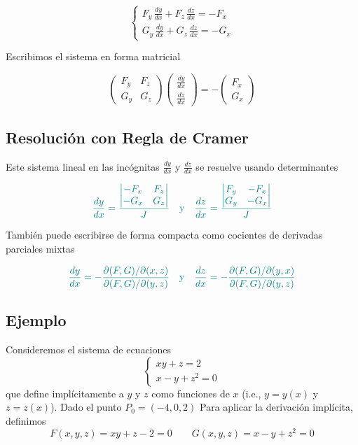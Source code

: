\documentclass{article}
\begin{document}
\[
\begin{cases}
F_y\,\frac{dy}{dx}+F_z\,\frac{dz}{dx}=-F_x \\
G_y\,\frac{dy}{dx}+G_z\,\frac{dz}{dx}=-G_x
\end{cases}
\]

Escribimos el sistema en forma matricial

\[
\begin{pmatrix}
F_y & F_z \\
G_y & G_z
\end{pmatrix}
\begin{pmatrix}
\frac{dy}{dx} \\
\frac{dz}{dx}
\end{pmatrix}
=
-\begin{pmatrix}
F_x \\
G_x
\end{pmatrix}
\]

\subsection*{Resolución con Regla de Cramer}

Este sistema lineal en las incógnitas \( \frac{dy}{dx} \) y \( \frac{dz}{dx} \) se resuelve usando determinantes

\[\color{teal}
\frac{dy}{dx} =
\frac{
\begin{vmatrix}
-F_x & F_z \\
-G_x & G_z
\end{vmatrix}
}{J}
\quad \text{y} \quad
\frac{dz}{dx} =
\frac{
\begin{vmatrix}
F_y & -F_x \\
G_y & -G_x
\end{vmatrix}
}{J}
\]

También puede escribirse de forma compacta como cocientes de derivadas parciales mixtas

\[\color{teal}
\frac{dy}{dx} = -\frac{\partial(F,G)/\partial(x,z)}{\partial(F,G)/\partial(y,z)}
\quad \text{y} \quad 
\frac{dz}{dx} = -\frac{\partial(F,G)/\partial(y,x)}{\partial(F,G)/\partial(y,z)}
\]
\subsection*{Ejemplo}

Consideremos el sistema de ecuaciones
\[
\begin{cases}
xy + z = 2 \\
x - y + z^2 = 0
\end{cases}
\]
que define implícitamente a \( y \) y \( z \) como funciones de \( x \) (i.e., \( y=y(x) \) y \( z=z(x) \)). Dado el punto $P_0=(-4,0,2)$ Para aplicar la derivación implícita, definimos
\[
F(x,y,z) = xy + z - 2 = 0 \qquad G(x,y,z) = x - y + z^2 = 0
\]
\end{document}
